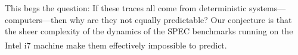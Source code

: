 %



%
This begs the question: If these traces all come from deterministic
systems---computers---then why are they not equally predictable?  Our
conjecture is that the sheer complexity of the dynamics of the SPEC
benchmarks running on the Intel i7\textsuperscript{\textregistered}
machine make them effectively impossible to predict.







